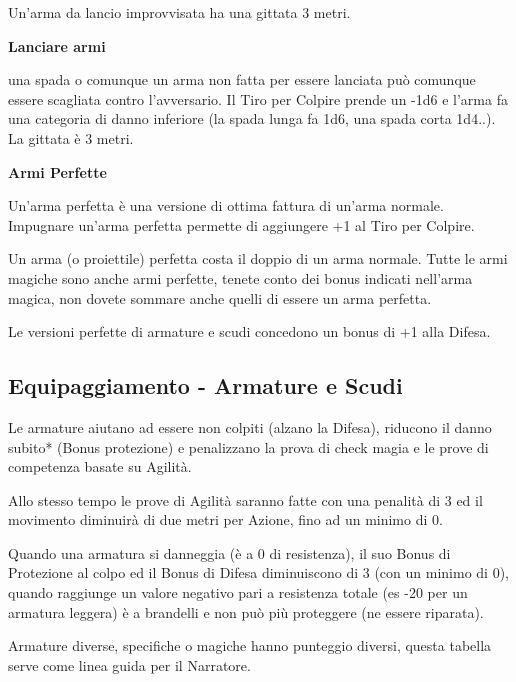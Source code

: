 \documentclass[a4paper,11pt,twoside,openany]{book}
\begin{document}
Un'arma da lancio improvvisata ha una gittata 3 metri.

\medskip

\textbf{Lanciare armi}

una spada o comunque un arma non fatta per essere lanciata può comunque essere scagliata contro l'avversario. Il Tiro per Colpire prende un -1d6 e l'arma fa una categoria di danno inferiore (la spada lunga fa 1d6, una spada corta 1d4..). La gittata è 3 metri.

\medskip

\textbf{Armi Perfette}

Un'arma perfetta è una versione di ottima fattura di un'arma normale.
Impugnare un'arma perfetta permette di aggiungere +1 al Tiro per Colpire.

Un arma (o proiettile) perfetta costa il doppio di un arma normale.
Tutte le armi magiche sono anche armi perfette, tenete conto dei bonus 	indicati nell'arma magica, non dovete sommare anche quelli di essere un arma perfetta.

Le versioni perfette di armature e scudi concedono un bonus di +1 alla Difesa.



\pagebreak

\subsection{Equipaggiamento - Armature e Scudi}

\label{equipaggiamento---armature-e-scudi}

Le armature aiutano ad essere non colpiti (alzano la Difesa), riducono il danno subito{*} (Bonus protezione) e penalizzano la prova di check magia e le prove di competenza basate su Agilità.

Allo stesso tempo le prove di Agilità saranno fatte con una penalità di 3 ed il movimento diminuirà di due metri per Azione, fino ad un minimo di 0.

Quando una armatura si danneggia (è a 0 di resistenza), il suo Bonus di Protezione al colpo ed il Bonus di Difesa diminuiscono di 3 (con un minimo di 0), quando raggiunge un valore negativo pari a resistenza totale (es -20 per un armatura leggera) è a brandelli e non può più proteggere (ne essere riparata).

Armature diverse, specifiche o magiche hanno punteggio diversi, questa tabella serve come linea guida per il Narratore.
\end{document}
